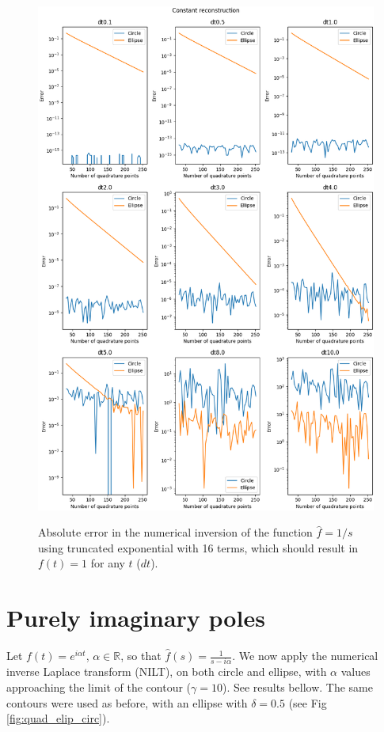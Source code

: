 \documentclass[10pt,a4paper,final]{article}
\begin{document}
\begin{figure}[h!]
\centering
\includegraphics[scale=0.5]{const_recon_trunc16}
\label{fig:const_trunc16}
\caption{Absolute error in the numerical inversion of the function $\widehat{f}=1/s$ using truncated exponential with 16 terms, which should result in $f(t)=1$ for any $t$ ($dt$). }
\end{figure}

\clearpage
\section{Purely imaginary poles}

Let $f(t)=e^{i\alpha t}$, $\alpha \in \mathbb{R}$,  so that $\widehat{f}(s)=\frac{1}{s-i\alpha}$. We now apply the numerical inverse Laplace transform (NILT), on both circle and ellipse, with $\alpha$ values approaching the limit of the contour ($\gamma=10$). See results bellow. The same contours were used as before, with an ellipse with $\delta=0.5$ (see Fig \ref{fig:quad_elip_circ}).
\end{document}
